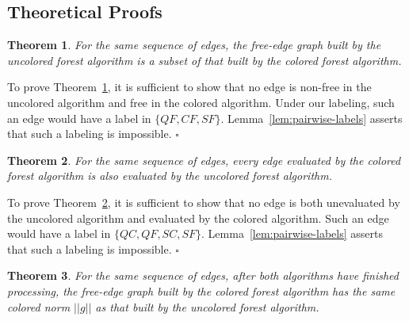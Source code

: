 \documentclass{report}
\newtheorem{theorem}{Theorem}
\newenvironment{proof}[1][Proof]{\begin{trivlist}
   \item[\hskip \labelsep {\bfseries #1}]}{\hfill$\square$\end{trivlist}}
\begin{document}
\subsection{Theoretical Proofs}

\begin{theorem}
For the same sequence of edges,
the free-edge graph built by the
uncolored forest algorithm
is a subset of that built by the
colored forest algorithm.
\label{thm:forest-tree-subset}
\end{theorem}

\begin{proof}
To prove Theorem~\ref{thm:forest-tree-subset},
it is sufficient to show that no edge is non-free in the uncolored algorithm
and free in the colored algorithm.
Under our labeling, such an edge would have a label in
$\{ QF, CF, SF \}$.
Lemma~\ref{lem:pairwise-labels} asserts that
such a labeling is impossible.
\end{proof}

\begin{theorem}
For the same sequence of edges,
every edge evaluated by the
colored forest algorithm
is also evaluated by the
uncolored forest algorithm.
\label{thm:forest-less-work}
\end{theorem}

\begin{proof}
To prove Theorem~\ref{thm:forest-less-work},
it is sufficient to show that no edge is both
unevaluated by the uncolored algorithm
and evaluated by the colored algorithm.
Such an edge would have a label in
$\{ QC, QF, SC, SF \}$.
Lemma~\ref{lem:pairwise-labels} asserts that
such a labeling is impossible.
\end{proof}

\begin{theorem}
For the same sequence of edges,
after both algorithms have finished processing,
the free-edge graph built by the
colored forest algorithm
has the same colored norm $||g||$
as that built by the
uncolored forest algorithm.
\label{thm:forest-same-score}
\end{theorem}
\end{document}
